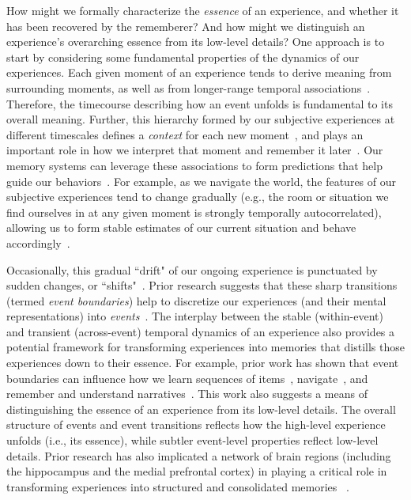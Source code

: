 \documentclass{article}
\begin{document}
How might we formally characterize the \textit{essence} of an experience, and whether it has been recovered by the rememberer?  And how might we distinguish an experience's overarching essence from its low-level details?  One approach is to start by considering some fundamental properties of the dynamics of our experiences.  Each given moment of an experience tends to derive meaning from surrounding moments, as well as from longer-range temporal associations~\citep{LernEtal11, Mann19, Mann20}.  Therefore, the timecourse describing how an event unfolds is fundamental to its overall meaning.  Further, this hierarchy formed by our subjective experiences at different timescales defines a \textit{context} for each new moment~\citep[e.g.,][]{HowaKaha02a, HowaEtal14}, and plays an important role in how we interpret that moment and remember it later~\citep[for review see][]{MannEtal15, Mann20}.  Our memory systems can leverage these associations to form predictions that help guide our behaviors~\citep{RangRitc12}.  For example, as we navigate the world, the features of our subjective experiences tend to change gradually (e.g., the room or situation we find ourselves in at any given moment is strongly temporally autocorrelated), allowing us to form stable estimates of our current situation and behave accordingly~\citep{ZackEtal07, ZwaaRadv98}.

Occasionally, this gradual ``drift" of our ongoing experience is punctuated by sudden changes, or ``shifts"~\citep[e.g., when we walk through a doorway; ][]{RadvZack17}.  Prior research suggests that these sharp transitions (termed \textit{event boundaries}) help to discretize our experiences (and their mental representations) into \textit{events}~\citep{RadvZack17, BrunEtal18, HeusEtal18b, ClewDava17, EzzyDava11, DuBrDava13}.  The interplay between the stable (within-event) and transient (across-event) temporal dynamics of an experience also provides a potential framework for transforming experiences into memories that distills those experiences down to their essence.  For example, prior work has shown that event boundaries can influence how we learn sequences of items~\citep{HeusEtal18b, DuBrDava13}, navigate~\citep{BrunEtal18}, and remember and understand narratives~\citep{ZwaaRadv98, EzzyDava11}.  This work also suggests a means of distinguishing the essence of an experience from its low-level details.  The overall structure of events and event transitions reflects how the high-level experience unfolds (i.e., its essence), while subtler event-level properties reflect low-level details.  Prior research has also implicated a network of brain regions (including the hippocampus and the medial prefrontal cortex) in playing a critical role in transforming experiences into structured and consolidated memories ~\citep{TompDava17}.
\end{document}
